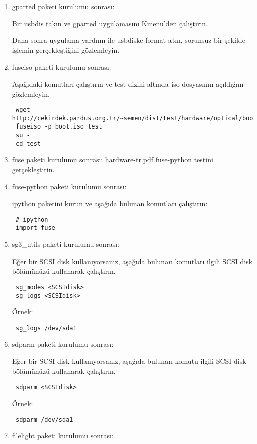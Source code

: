 \documentclass[a4paper,10pt]{article}
\begin{document}
\begin{enumerate}
\item gparted paketi kurulumu sonrası:

Bir usbdis takın ve gparted uygulamasını Kmenu'den çalıştırın. 

Daha sonra uygulama yardımı ile usbdiske format atın, sorunsuz bir şekilde işlemin gerçekleştiğini gözlemleyin.
\item fuseiso paketi kurulumu sonrası:

Aşağıdaki komutları çalıştırın ve test dizini altında iso dosyasının açıldığını gözlemleyin.
\begin{verbatim}
 wget http://cekirdek.pardus.org.tr/~semen/dist/test/hardware/optical/boot.iso
 fuseiso -p boot.iso test
 su -
 cd test
\end{verbatim}

\item fuse paketi kurulumu sonrası:
hardware-tr.pdf fuse-python testini gerçekleştirin.

\item fuse-python paketi kurulumu sonrası:

ipython paketini kurun ve aşağıda bulunan komutları çalıştırın:
\begin{verbatim}
 # ipython
 import fuse
\end{verbatim}

\item sg3\_utils  paketi kurulumu sonrası:

Eğer bir SCSI disk kullanıyorsanız, aşağıda bulunan komutları ilgili SCSI disk bölümünüzü kullanarak çalıştırın.
\begin{verbatim}
 sg_modes <SCSIdisk>
 sg_logs <SCSIdisk>
\end{verbatim}

Örnek:
\begin{verbatim}
 sg_logs /dev/sda1
\end{verbatim}

\item sdparm paketi kurulumu sonrası:

Eğer bir SCSI disk kullanıyorsanız, aşağıda bulunan komutu ilgili SCSI disk bölümünüzü kullanarak çalıştırın.
\begin{verbatim}
 sdparm <SCSIdisk>
\end{verbatim}

Örnek:
\begin{verbatim}
 sdparm /dev/sda1
\end{verbatim}


\item filelight paketi kurulumu sonrası:


\end{enumerate}
\end{document}
